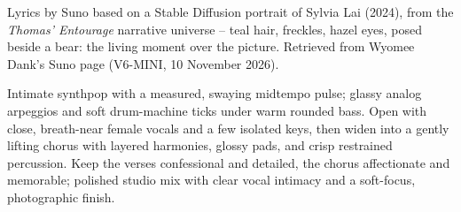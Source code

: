 
\label{sec:hold-still-a-moment}
\begin{notes}
Lyrics by Suno based on a Stable Diffusion portrait of Sylvia Lai (2024), from the \emph{Thomas' Entourage} narrative universe -- teal hair, freckles, hazel eyes, posed beside a bear: the living moment over the picture. Retrieved from Wyomee Dank's Suno page (V6-MINI, 10 November 2026).
\end{notes}
\begin{style}
Intimate synthpop with a measured, swaying midtempo pulse; glassy analog arpeggios and soft drum-machine ticks under warm rounded bass. Open with close, breath-near female vocals and a few isolated keys, then widen into a gently lifting chorus with layered harmonies, glossy pads, and crisp restrained percussion. Keep the verses confessional and detailed, the chorus affectionate and memorable; polished studio mix with clear vocal intimacy and a soft-focus, photographic finish.
\end{style}

